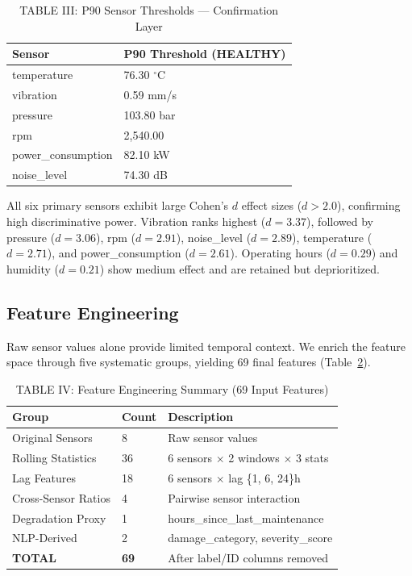\documentclass[conference]{IEEEtran}
\begin{document}
\begin{table}[htbp]
\caption{TABLE III: P90 Sensor Thresholds --- Confirmation Layer}
\centering
\begin{tabular}{ll}
\hline
\textbf{Sensor} & \textbf{P90 Threshold (HEALTHY)} \\
\hline
temperature        & 76.30 $^\circ$C \\
vibration          & 0.59 mm/s \\
pressure           & 103.80 bar \\
rpm                & 2,540.00 \\
power\_consumption & 82.10 kW \\
noise\_level       & 74.30 dB \\
\hline
\end{tabular}
\label{tab:p90}
\end{table}

All six primary sensors exhibit large Cohen's $d$ effect sizes ($d > 2.0$),
confirming high discriminative power. Vibration ranks highest ($d=3.37$),
followed by pressure ($d=3.06$), rpm ($d=2.91$), noise\_level ($d=2.89$),
temperature ($d=2.71$), and power\_consumption ($d=2.61$). Operating hours
($d=0.29$) and humidity ($d=0.21$) show medium effect and are retained but
deprioritized.

\subsection{Feature Engineering}

Raw sensor values alone provide limited temporal context. We enrich the
feature space through five systematic groups, yielding 69 final features
(Table~\ref{tab:features}).

\begin{table}[htbp]
\caption{TABLE IV: Feature Engineering Summary (69 Input Features)}
\centering
\begin{tabular}{lll}
\hline
\textbf{Group} & \textbf{Count} & \textbf{Description} \\
\hline
Original Sensors    &  8 & Raw sensor values \\
Rolling Statistics  & 36 & 6 sensors $\times$ 2 windows $\times$ 3 stats \\
Lag Features        & 18 & 6 sensors $\times$ lag \{1, 6, 24\}h \\
Cross-Sensor Ratios &  4 & Pairwise sensor interaction \\
Degradation Proxy   &  1 & hours\_since\_last\_maintenance \\
NLP-Derived         &  2 & damage\_category, severity\_score \\
\hline
\textbf{TOTAL} & \textbf{69} & After label/ID columns removed \\
\hline
\end{tabular}
\label{tab:features}
\end{table}
\end{document}
